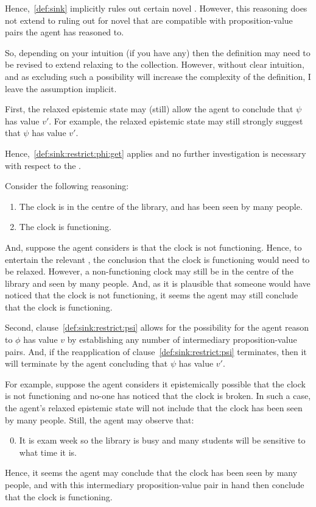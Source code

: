 \begin{note}
{    Hence,~\autoref{def:sink} implicitly rules out certain novel \epN{} .
    However, this reasoning does not extend to ruling out for novel  that are compatible with proposition-value pairs the agent has reasoned to.

    So, depending on your intuition (if you have any) then the definition may need to be revised to extend relaxing to the collection.
    However, without clear intuition, and as excluding such a possibility will increase the complexity of the definition, I leave the assumption implicit.
  }
\end{note}

\begin{note}
  First, the relaxed epistemic state may (still) allow the agent to conclude that \(\psi\) has value \(v'\).
  For example, the relaxed epistemic state may still strongly suggest that \(\psi\) has value \(v'\).

  Hence,~\ref{def:sink:restrict:phi:get} applies and no further investigation is necessary with respect to the \epN{} \world{}.

  Consider the following reasoning:
  \begin{enumerate}
  \item The clock is in the centre of the library, and has been seen by many people.
  \item The clock is functioning.
  \end{enumerate}
  And, suppose the agent considers is \epN{} that the clock is not functioning.
  Hence, to entertain the relevant \ep{}, the conclusion that the clock is functioning would need to be relaxed.
  However, a non-functioning clock may still be in the centre of the library and seen by many people.
  And, as it is plausible that someone would have noticed that the clock is not functioning, it seems the agent may still conclude that the clock is functioning.
\end{note}

\begin{note}
  Second, clause~\ref{def:sink:restrict:psi} allows for the possibility for the agent reason to \(\phi\) has value \(v\) by establishing any number of intermediary proposition-value pairs.
  And, if the reapplication of clause~\ref{def:sink:restrict:psi} terminates, then it will terminate by the agent concluding that \(\psi\) has value \(v'\).

  For example, suppose the agent considers it epistemically possible that the clock is not functioning and no-one has noticed that the clock is broken.
  In such a case, the agent's relaxed epistemic state will not include that the clock has been seen by many people.
  Still, the agent may observe that:
  \begin{enumerate}
    \setcounter{enumi}{-1}
  \item It is exam week so the library is busy and many students will be sensitive to what time it is.
  \end{enumerate}
  Hence, it seems the agent may conclude that the clock has been seen by many people, and with this intermediary proposition-value pair in hand then conclude that the clock is functioning.
\end{note}


